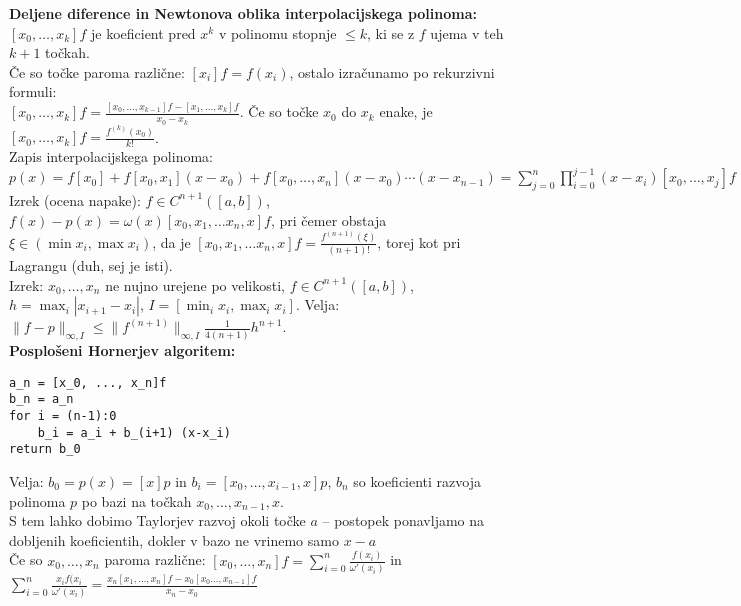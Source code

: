 \documentclass[a4paper,12pt]{article}
\theoremstyle{definition}
\begin{document}
\textbf{Deljene diference in Newtonova oblika interpolacijskega polinoma:}\\
$[x_0, \ldots, x_k]f$ je koeficient pred $x^k$ v polinomu stopnje $\leq k$,
ki se z $f$ ujema v teh $k+1$ točkah.\\
Če so točke paroma različne: $[x_i]f = f(x_i)$, ostalo izračunamo po
rekurzivni formuli: \\$[x_0, \ldots, x_k]f = \frac{[x_0, \ldots, x_{k-1}]f -[x_1, \ldots, x_k]f }{x_0-x_k}$. Če
so točke $x_0$ do $x_k$ enake, je $[x_0, \ldots, x_k]f = \frac{f^{(k)}(x_0)}{k!}$.\\
Zapis interpolacijskega polinoma: \\
$p(x) = f[x_0] + f[x_0, x_1] (x-x_0) +  f[x_0, \dots, x_n](x-x_0)\cdots (x-x_{n-1}) =
\sum_{j=0}^n \prod_{i=0}^{j-1}(x-x_i) [x_0, \ldots, x_j]f$\\
Izrek (ocena napake): $f \in C^{n+1}([a,b])$, $f(x) - p(x) = \omega(x) [x_0, x_1, \ldots x_n, x]f$,
pri čemer obstaja $\xi \in (\min x_i, \max x_i)$, da je
$[x_0, x_1, \ldots x_n, x]f = \frac{f^{(n+1)} (\xi)}{(n+1)!}$, torej kot pri Lagrangu (duh, sej je isti).\\
Izrek: $x_0, \ldots, x_n$ ne nujno urejene po velikosti, $f \in
C^{n+1}([a,b])$, $h = \max_i |x_{i+1} - x_i|$, $I = [\min_i x_i, \max_i x_i]$.
Velja: $\|f-p\|_{\infty, I} \leq \|f^{(n+1)}\|_{\infty, I} \frac{1}{4 (n+1)}
h^{n+1}$.\\
\textbf{Posplošeni Hornerjev algoritem:} \vspace{-\baselineskip}
\small
\begin{verbatim}
a_n = [x_0, ..., x_n]f
b_n = a_n
for i = (n-1):0
    b_i = a_i + b_(i+1) (x-x_i)
return b_0
\end{verbatim}
\normalsize
Velja: $b_0 = p(x) = [x]p$ in $b_i = [x_0, \ldots, x_{i-1}, x]p$, $b_n$ so
koeficienti razvoja polinoma $p$ po bazi na točkah $x_0, \ldots, x_{n-1}, x$.\\
S tem lahko dobimo Taylorjev razvoj okoli točke $a$ -- postopek ponavljamo na
dobljenih koeficientih, dokler v bazo ne vrinemo samo $x-a$\\
Če so $x_0, \ldots, x_n$ paroma različne: $[x_0, \ldots, x_n]f = \sum_{i=0}^n
\frac{f(x_i)}{\omega'(x_i)}$ in $\sum_{i=0}^n \frac{x_i f(x_i}{\omega'(x_i)} =
\frac{x_n [x_1, \ldots, x_n]f - x_0 [x_0 \ldots, x_{n-1}]f}{x_n - x_0}$\\
\end{document}

